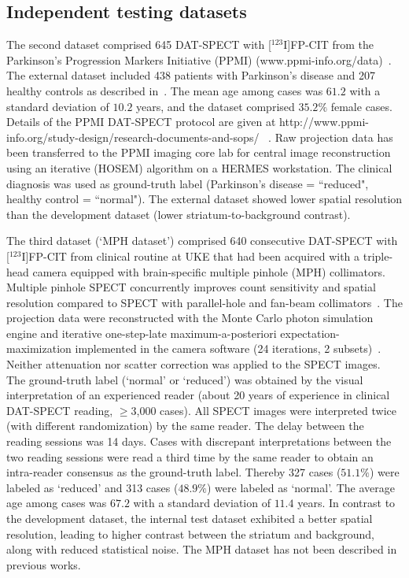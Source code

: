 \subsection{Independent testing datasets}
\label{subsec:external_dataset}

The second dataset comprised 645 DAT-SPECT with [$^{123}$I]FP-CIT from the Parkinson's Progression Markers Initiative (PPMI) 
(www.ppmi-info.org/data)~\citep{Parkinson_Progression_Marker_Initiative2011-px}.
The external dataset included 438 patients with Parkinson's disease and 207 healthy controls as described in~\cite{Wenzel2019}.
The mean age among cases was $61.2$ with a standard deviation of $10.2$ years, 
and the dataset comprised $35.2\%$ female cases.
Details of the PPMI DAT-SPECT protocol are given at http://www.ppmi-info.org/study-design/research-documents-and-sops/ ~\citep{Parkinson_Progression_Marker_Initiative2011-px}. 
Raw projection data has been transferred to the PPMI imaging core lab for central image reconstruction using an iterative (HOSEM) algorithm on a HERMES workstation. 
The clinical diagnosis was used as ground-truth label (Parkinson's disease = ``reduced", healthy control = ``normal"). 
The external dataset showed lower spatial resolution than the development dataset (lower striatum-to-background contrast).

The third dataset (`MPH dataset') comprised 640 consecutive DAT-SPECT with [$^{123}$I]FP-CIT from clinical routine at UKE 
that had been acquired with a triple-head camera equipped with brain-specific multiple pinhole (MPH) collimators. 
Multiple pinhole SPECT concurrently improves count sensitivity and spatial resolution compared to SPECT with parallel-hole 
and fan-beam collimators~\citep{Mathies2022-yi, Tecklenburg2020-xr}.
The projection data were reconstructed with the Monte Carlo photon simulation engine 
and iterative one-step-late maximum-a-posteriori expectation-maximization implemented 
in the camera software (24 iterations, 2 subsets)~\citep{Tecklenburg2020-xr, Magdics2010}.
Neither attenuation nor scatter correction was applied to the SPECT images.
The ground-truth label (`normal' or `reduced') was obtained by the visual interpretation of an experienced reader 
(about 20 years of experience in clinical DAT-SPECT reading, $\geq$3,000 cases).
All SPECT images were interpreted twice (with different randomization) by the same reader. 
The delay between the reading sessions was 14 days. 
Cases with discrepant interpretations between the two reading sessions were read a third time by the same reader 
to obtain an intra-reader consensus as the ground-truth label. 
Thereby 327 cases ($51.1\%$) were labeled as `reduced'  and 313 cases ($48.9\%$) were labeled as `normal'.
The average age among cases was $67.2$ with a standard deviation of $11.4$ years.
In contrast to the development dataset, the internal test dataset exhibited a better spatial resolution, 
leading to higher contrast between the striatum and background, along with reduced statistical noise.
The MPH dataset has not been described in previous works.

